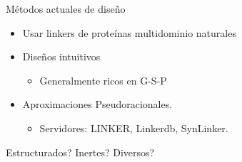 \documentclass{beamer}
\begin{document}



\begin{frame}{Métodos actuales de diseño}
\begin{itemize}

\item Usar linkers de proteínas multidominio naturales

\item Diseños intuitivos
 \begin{itemize}
  \item Generalmente ricos en G-S-P 
  \end{itemize}
\item Aproximaciones Pseudoracionales. 
\begin{itemize}
 \item Servidores: LINKER, Linkerdb, SynLinker.
\end{itemize}
\end{itemize}
\vspace{20px}
\LARGE{Estructurados? Inertes? Diversos?}
\end{frame}














\end{document}
